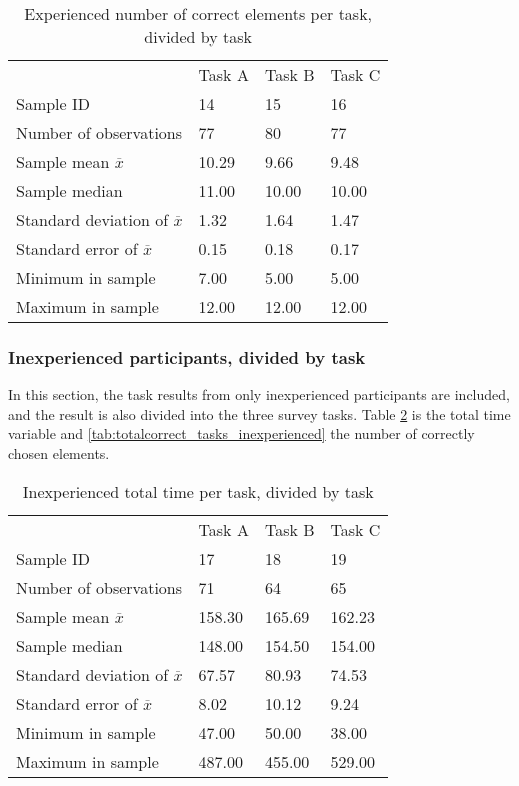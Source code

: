 \begin{table}[H]
	\centering
	\begin{tabular}{l|l|l|l}
		 & Task A & Task B & Task C \\ 
		Sample ID & 14 & 15  & 16   \\ \hline
		Number of observations & 77    & 80      &  77  \\
		Sample mean $\overline{x}$ & 10.29  &  9.66  &  9.48   \\
		Sample median & 11.00  &  10.00  &  10.00  \\
		Standard deviation of $\overline{x}$ & 1.32  & 1.64  & 1.47   \\
		Standard error of $\overline{x}$ & 0.15  & 0.18  & 0.17   \\
		Minimum in sample & 7.00 & 5.00 &  5.00 \\
		Maximum in sample  & 12.00 & 12.00  & 12.00 \\ \hline
	\end{tabular}
	\caption[Correct elements, divided by task, only inexperienced]{Experienced number of correct elements per task, divided by task}
	\label{tab:totalcorrect_tasks_experienced}
\end{table}

\subsubsection{Inexperienced participants, divided by task}\label{sec:taskdivided_inexperienced}
In this section, the task results from only inexperienced participants are included, and the result is also divided into the three survey tasks. 
Table \ref{tab:totaltime_tasks_inexperienced} is the total time variable and \ref{tab:totalcorrect_tasks_inexperienced} the number of correctly chosen elements. 

\begin{table}[H]
	\centering
	\begin{tabular}{l|l|l|l}
		 & Task A & Task B & Task C \\ 
		Sample ID & 17 & 18 & 19 \\ \hline
		Number of observations & 71    & 64  & 65   \\
		Sample mean $\overline{x}$  & 158.30  &  165.69  &  162.23  \\
		Sample median & 148.00  &  154.50  &  154.00  \\
		Standard deviation of $\overline{x}$  & 67.57 & 80.93 & 74.53  \\
		Standard error of $\overline{x}$  & 8.02  & 10.12 & 9.24  \\
		Minimum in sample & 47.00 & 50.00 &  38.00 \\
		Maximum in sample & 487.00 & 455.00  & 529.00  \\ \hline
	\end{tabular}
	\caption[Total time, inexperienced per task]{Inexperienced total time per task, divided by task}
	\label{tab:totaltime_tasks_inexperienced}
\end{table}

